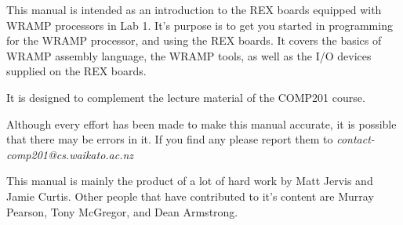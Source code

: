 This manual is intended as an introduction to the REX boards equipped with WRAMP processors in Lab 1.
It's purpose is to get you started in programming for the WRAMP processor, and using the REX boards. It covers the basics of WRAMP assembly language, the WRAMP tools, as well as the I/O devices supplied on the REX boards.

It is designed to complement the lecture material of the COMP201 course.

Although every effort has been made to make this manual accurate, it is
possible that there may be errors in it.  If you find any please report
them to \emph{contact-comp201@cs.waikato.ac.nz}

This manual is mainly the product of a lot of hard work by Matt Jervis
and Jamie Curtis. Other people that have contributed to it's content
are Murray Pearson, Tony McGregor, and Dean Armstrong.
